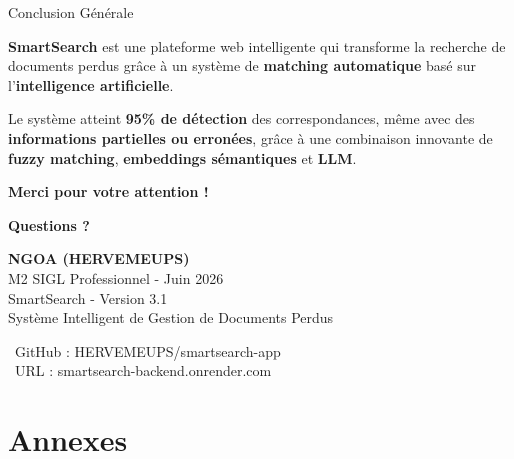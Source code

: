 \documentclass[aspectratio=169]{beamer}
\begin{document}
\begin{frame}{Conclusion Générale}
    \begin{center}
        \Large
        \textbf{SmartSearch} est une plateforme web intelligente qui transforme la recherche de documents perdus grâce à un système de \textbf{matching automatique} basé sur l'\textbf{intelligence artificielle}.

        \vspace{1cm}

        Le système atteint \textbf{95\% de détection} des correspondances, même avec des \textbf{informations partielles ou erronées}, grâce à une combinaison innovante de \textbf{fuzzy matching}, \textbf{embeddings sémantiques} et \textbf{LLM}.

        \vspace{1cm}

        \huge
        \textbf{Merci pour votre attention !}
    \end{center}
\end{frame}

\begin{frame}
    \begin{center}
        \Huge
        \textbf{Questions ?}

        \vspace{2cm}

        \normalsize
        \textbf{NGOA (HERVEMEUPS)} \\
        M2 SIGL Professionnel - Juin 2026 \\
        \vspace{0.5cm}
        SmartSearch - Version 3.1 \\
        Système Intelligent de Gestion de Documents Perdus

        \vspace{1cm}

        \small
        \faGithub\ GitHub : HERVEMEUPS/smartsearch-app \\
        \faGlobe\ URL : smartsearch-backend.onrender.com
    \end{center}
\end{frame}

\appendix
\section{Annexes}
\end{document}
